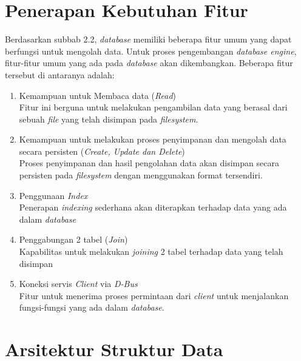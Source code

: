 \section{Penerapan Kebutuhan Fitur}
Berdasarkan subbab 2.2, \emph{database} memiliki beberapa fitur umum yang dapat berfungsi untuk mengolah data. 
Untuk proses pengembangan \emph{database engine}, fitur-fitur umum yang ada pada \emph{database} 
akan dikembangkan. Beberapa fitur tersebut di antaranya adalah:
\begin{enumerate}
	\item Kemampuan untuk Membaca data (\emph{Read}) \\
	Fitur ini berguna untuk melakukan pengambilan data yang berasal dari sebuah \emph{file} yang telah disimpan pada \emph{filesystem}.

	\item Kemampuan untuk melakukan proses penyimpanan dan mengolah data secara persisten (\emph{Create, Update dan Delete}) \\
	Proses penyimpanan dan hasil pengolahan data akan disimpan secara persisten pada \emph{filesystem} dengan menggunakan format
  tersendiri. 


	\item Penggunaan \emph{Index} \\
	Penerapan \emph{indexing} sederhana akan diterapkan terhadap data yang ada dalam \emph{database}

	\item Penggabungan 2 tabel (\emph{Join}) \\
	Kapabilitas untuk melakukan \emph{joining} 2 tabel terhadap data yang telah disimpan

	\item Koneksi servis \emph{Client} via \emph{D-Bus} \\	
  Fitur untuk menerima proses permintaan dari \emph{client} untuk menjalankan fungsi-fungsi yang ada dalam \emph{database}.
			
\end{enumerate}

\section{Arsitektur Struktur Data}

